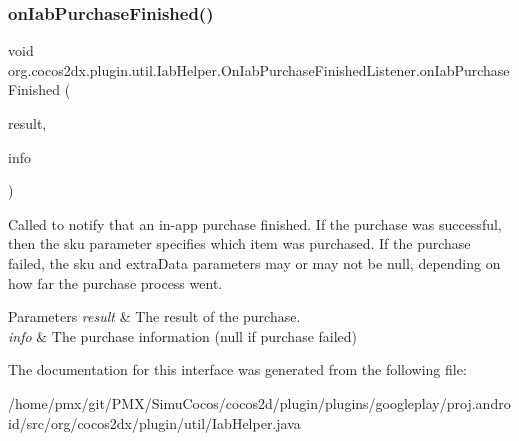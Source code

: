 \subsubsection{\texorpdfstring{on\+Iab\+Purchase\+Finished()}{onIabPurchaseFinished()}}
{\footnotesize\ttfamily void org.\+cocos2dx.\+plugin.\+util.\+Iab\+Helper.\+On\+Iab\+Purchase\+Finished\+Listener.\+on\+Iab\+Purchase\+Finished (\begin{DoxyParamCaption}\item[{\hyperlink{classorg_1_1cocos2dx_1_1plugin_1_1util_1_1IabResult}{Iab\+Result}}]{result,  }\item[{\hyperlink{classorg_1_1cocos2dx_1_1plugin_1_1util_1_1Purchase}{Purchase}}]{info }\end{DoxyParamCaption})}

Called to notify that an in-\/app purchase finished. If the purchase was successful, then the sku parameter specifies which item was purchased. If the purchase failed, the sku and extra\+Data parameters may or may not be null, depending on how far the purchase process went.


\begin{DoxyParams}{Parameters}
{\em result} & The result of the purchase. \\
\hline
{\em info} & The purchase information (null if purchase failed) \\
\hline
\end{DoxyParams}


The documentation for this interface was generated from the following file\+:\begin{DoxyCompactItemize}
\item 
/home/pmx/git/\+P\+M\+X/\+Simu\+Cocos/cocos2d/plugin/plugins/googleplay/proj.\+android/src/org/cocos2dx/plugin/util/Iab\+Helper.\+java\end{DoxyCompactItemize}
